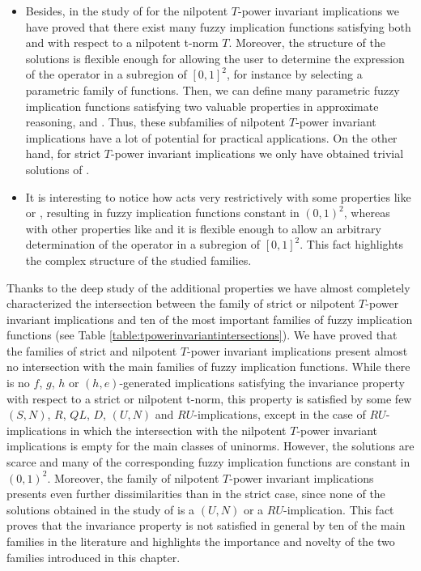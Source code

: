\begin{itemize}
	\item Besides, in the study of \TC for the nilpotent $T$-power invariant implications we have proved that there exist many fuzzy implication functions satisfying both \TC and \PIT with respect to a nilpotent t-norm $T$. Moreover, the structure of the solutions is flexible enough for allowing the user to determine the expression of the operator in a subregion of $[0,1]^2$, for instance by selecting a parametric family of functions. Then, we can define many parametric fuzzy implication functions satisfying two valuable properties in approximate reasoning, \PIT and \TC. Thus, these subfamilies of nilpotent $T$-power invariant implications have a lot of potential for practical applications. On the other hand, for strict $T$-power invariant implications we only have obtained trivial solutions of \TC.
	\item It is interesting to notice how \PIT acts very restrictively with some properties like \LI or \NP, resulting in fuzzy implication functions constant in $(0,1)^2$, whereas with other properties like \EP and \TC it is flexible enough to allow an arbitrary determination of the operator in a subregion of $[0,1]^2$. This fact highlights the complex structure of the studied families.
\end{itemize}

Thanks to the deep study of the additional properties we have almost completely characterized the intersection between the family of strict or nilpotent $T$-power invariant implications and ten of the most important families of fuzzy implication functions (see Table \ref{table:tpowerinvariantintersections}). We have proved that the families of strict and nilpotent $T$-power invariant implications present almost no intersection with the main families of fuzzy implication functions. While there is no $f$, $g$, $h$ or $(h,e)$-generated implications satisfying the invariance property with respect to a strict or nilpotent t-norm, this property is satisfied by some few $(S,N)$, $R$, $QL$, $D$, $(U,N)$ and $RU$-implications, except in the case of $RU$-implications in which the intersection with the nilpotent $T$-power invariant implications is empty for the main classes of uninorms. However, the solutions are scarce and many of the corresponding fuzzy implication functions are constant in $(0,1)^2$.   Moreover, the family of nilpotent $T$-power invariant implications presents even further dissimilarities than in the strict case, since none of the solutions obtained in the study of \EP is a $(U,N)$ or a $RU$-implication. This fact proves that the invariance property is not satisfied in general by ten of the main families in the literature and highlights the importance and novelty of the two families introduced in this chapter. 

